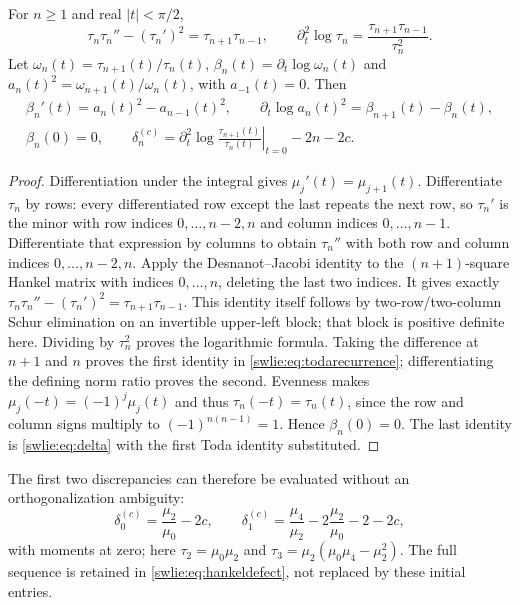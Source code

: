 \documentclass[11pt]{article}
\begin{document}
\begin{swlietheorem}\label{swlie:thm:toda}
For $n\geq1$ and real $|t|<\pi/2$,
\begin{equation}\label{swlie:eq:toda}
 \tau_n\tau_n''-(\tau_n')^2=\tau_{n+1}\tau_{n-1},
 \qquad \partial_t^2\log\tau_n
                    =\frac{\tau_{n+1}\tau_{n-1}}{\tau_n^2}.
\end{equation}
Let $\omega_n(t)=\tau_{n+1}(t)/\tau_n(t)$,
$\beta_n(t)=\partial_t\log\omega_n(t)$ and
$a_n(t)^2=\omega_{n+1}(t)/\omega_n(t)$, with $a_{-1}(t)=0$.
Then
\begin{equation}\label{swlie:eq:todarecurrence}
 \begin{gathered}
 \beta_n'(t)=a_n(t)^2-a_{n-1}(t)^2,\qquad
 \partial_t\log a_n(t)^2=\beta_{n+1}(t)-\beta_n(t),\\
 \beta_n(0)=0,\qquad
 \delta_n^{(c)}
   =\left.\partial_t^2\log\frac{\tau_{n+1}(t)}{\tau_n(t)}
                                               \right|_{t=0}-2n-2c .
 \end{gathered}
\end{equation}
\end{swlietheorem}
\begin{proof}
Differentiation under the integral gives
$\mu_j'(t)=\mu_{j+1}(t)$. Differentiate $\tau_n$ by rows:
every differentiated row except the last repeats the next
row, so $\tau_n'$ is the minor with row indices
$0,\ldots,n-2,n$ and column indices $0,\ldots,n-1$.
Differentiate that expression by columns to obtain
$\tau_n''$ with both row and column indices
$0,\ldots,n-2,n$. Apply the Desnanot--Jacobi identity
to the $(n+1)$-square Hankel matrix with indices $0,\ldots,n$,
deleting the last two indices. It gives exactly
$\tau_n\tau_n''-(\tau_n')^2=\tau_{n+1}\tau_{n-1}$.
This identity itself follows by two-row/two-column
Schur elimination on an invertible upper-left block;
that block is positive definite here. Dividing by
$\tau_n^2$ proves the logarithmic formula.
Taking the difference at $n+1$ and $n$ proves the first
identity in \eqref{swlie:eq:todarecurrence}; differentiating
the defining norm ratio proves the second.
Evenness makes $\mu_j(-t)=(-1)^j\mu_j(t)$ and thus
$\tau_n(-t)=\tau_n(t)$, since the row and column signs
multiply to $(-1)^{n(n-1)}=1$. Hence $\beta_n(0)=0$.
The last identity is \eqref{swlie:eq:delta} with the first
Toda identity substituted.
\end{proof}

The first two discrepancies can therefore be evaluated
without an orthogonalization ambiguity:
\[
 \delta_0^{(c)}=\frac{\mu_2}{\mu_0}-2c,\qquad
 \delta_1^{(c)}=\frac{\mu_4}{\mu_2}
              -2\frac{\mu_2}{\mu_0}-2-2c,
\]
with moments at zero; here
$\tau_2=\mu_0\mu_2$ and
$\tau_3=\mu_2(\mu_0\mu_4-\mu_2^2)$.
The full sequence is retained in \eqref{swlie:eq:hankeldefect},
not replaced by these initial entries.
\end{document}
